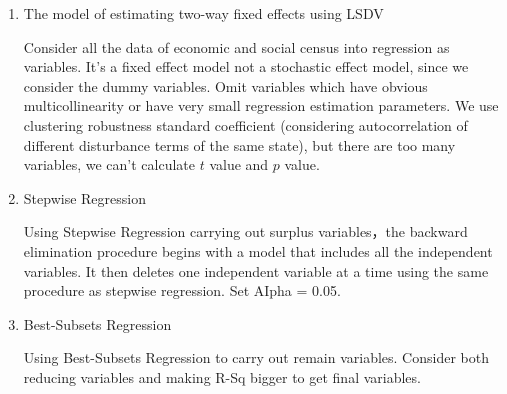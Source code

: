 \documentclass{mcmthesis}
\numberwithin{equation}{section}
\numberwithin{figure}{section}
\numberwithin{table}{section}
\theoremstyle{mydef}
\begin{document}
\begin{enumerate}
\item The model of estimating two-way fixed effects using LSDV\cite{b7}

Consider all the data of economic and social census into regression as variables. It's a fixed effect model not a stochastic effect model, since we consider the dummy variables. Omit variables which have obvious multicollinearity or have very small regression estimation parameters.
We use clustering robustness standard coefficient (considering autocorrelation of different disturbance terms of the same state), but there are too many variables, we can't calculate $t$ value and $p$ value.
\item Stepwise Regression

Using Stepwise Regression carrying out surplus variables，the backward elimination procedure begins with a model that includes all the independent variables. It then deletes one independent variable at a time using the same procedure as stepwise regression. Set AIpha = 0.05.
\item Best-Subsets Regression\cite{b8}

Using Best-Subsets Regression to carry out remain variables. Consider both reducing variables and making R-Sq bigger to get final variables.
\end{enumerate}
\end{document}
